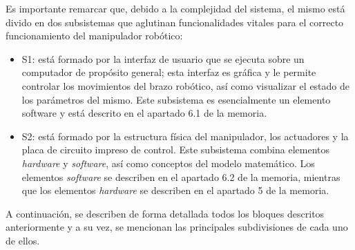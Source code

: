 Es importante remarcar que, debido a la complejidad del sistema, el mismo está divido en dos subsistemas que aglutinan funcionalidades vitales para el correcto funcionamiento del manipulador robótico:

\begin{itemize}
    \item \ac{S1}: está formado por la interfaz de usuario que se ejecuta sobre un computador de propósito general; esta interfaz es gráfica y le permite controlar los movimientos del brazo robótico, así como visualizar el estado de los parámetros del mismo. Este subsistema es esencialmente un elemento software y está descrito en el apartado 6.1 de la memoria.
    
    \item \ac{S2}: está formado por la estructura física del manipulador, los actuadores y la placa de circuito impreso de control. Este subsistema combina elementos \textit{hardware} y \textit{software}, así como conceptos del modelo matemático. Los elementos \textit{software} se describen en el apartado 6.2 de la memoria, mientras que los elementos \textit{hardware} se describen en el apartado 5 de la memoria.
\end{itemize}

A continuación, se describen de forma detallada todos los bloques descritos anteriormente y a su vez, se mencionan las principales subdivisiones de cada uno de ellos.\\
